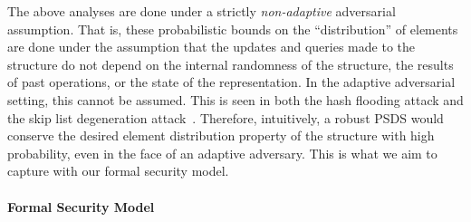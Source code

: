 The above analyses are done under a strictly \emph{non-adaptive} adversarial assumption. That is, these probabilistic bounds on the ``distribution'' of elements are done under the assumption that the updates and queries made to the structure do not depend on the internal randomness of the structure, the results of past operations, or the state of the representation. In the adaptive adversarial setting, this cannot be assumed. This is seen in both the hash flooding attack and the skip list degeneration attack~\cite{CrosbyW03,bar2007remote,klink2011efficient,nussbaum2019skiplist}. 
Therefore, intuitively, a robust PSDS would conserve the desired element distribution property of the structure with high probability, even in the face of an adaptive adversary. This is what we aim to capture with our formal security model.

\paragraph{Formal Security Model}

